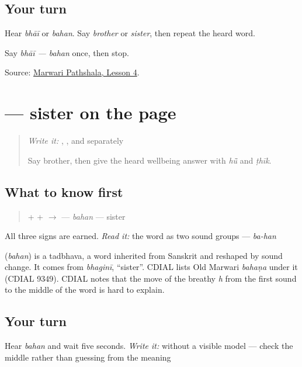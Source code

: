 \subsection*{Your turn}
Hear \emph{bhāī} or \emph{bahan}. Say \emph{brother} or \emph{sister}, then repeat the heard word.

\begin{tcolorbox}[breakable,colback=teal!4,colframe=teal!35!black,title={Before you move on}]
Say \emph{bhāī — bahan} once, then stop.

Source: \href{https://www.marwaripathshala.com/marwari-lesson-4-english}{Marwari Pathshala, Lesson 4}.
\end{tcolorbox}
\section[\texorpdfstring{\mw{बहन} (bahan)}{बहन (bahan)}]{ — sister on the page}

\label{lesson:MW-C08-bahan}



\begin{quote}
\emph{Write it:} \textbf{}, \textbf{}, and \textbf{} separately

Say brother, then give the heard wellbeing answer with \emph{hū̃} and \emph{ṭhīk}.
\end{quote}

\subsection*{What to know first}
\begin{quote}
\textbf{} + \textbf{} + \textbf{} $\to$ \textbf{} — \emph{bahan} — sister
\end{quote}

All three signs are earned. \emph{Read it:} the word as two sound groups — \emph{ba-han}

\begin{cousinweb}
\textbf{} (\emph{bahan}) is a tadbhava, a word inherited from Sanskrit and reshaped by sound change. It comes from \emph{bhaginī}, \textquotedblleft{}sister\textquotedblright{}. CDIAL lists Old Marwari \emph{bahaṇa} under it (CDIAL 9349). CDIAL notes that the move of the breathy \emph{h} from the first sound to the middle of the word is hard to explain.
\end{cousinweb}

\subsection*{Your turn}
Hear \emph{bahan} and wait five seconds. \emph{Write it:} \textbf{} without a visible model — check the middle \textbf{} rather than guessing from the meaning

